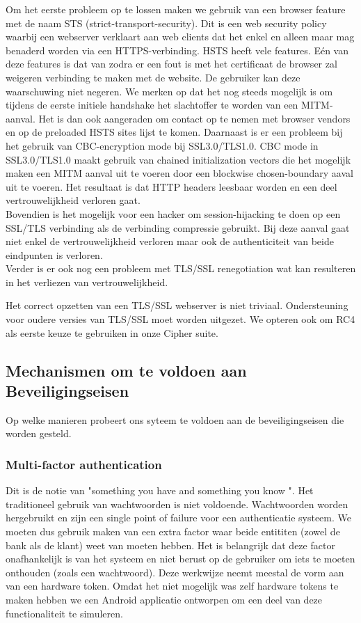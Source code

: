 \documentclass[11pt]{article}
\begin{document}
Om het eerste probleem op te lossen maken we gebruik van een browser feature met de naam STS (strict-transport-security). Dit is een web security policy waarbij een webserver verklaart aan web clients dat het enkel en alleen maar mag benaderd worden via een HTTPS-verbinding. HSTS heeft vele features. E\'en van deze features is dat van zodra er een fout is met het certificaat de browser zal weigeren verbinding te maken met de website. De gebruiker kan deze waarschuwing niet negeren. We merken op dat het nog steeds mogelijk is om tijdens de eerste initiele handshake het slachtoffer te worden van een MITM-aanval. Het is dan ook aangeraden om contact op te nemen met browser vendors en op de preloaded HSTS sites lijst te komen. \cite{HSTS} \cite{STS} \cite{prehsts}
\newline
Daarnaast is er een probleem bij het gebruik van CBC-encryption mode bij SSL3.0/TLS1.0. CBC mode in SSL3.0/TLS1.0 maakt gebruik van chained initialization vectors die het mogelijk maken een MITM aanval uit te voeren door een blockwise chosen-boundary aaval uit te voeren. Het resultaat is dat HTTP headers leesbaar worden en een deel vertrouwelijkheid verloren gaat.\cite{BEAST} \\

Bovendien is het mogelijk voor een hacker om session-hijacking te doen op een SSL/TLS verbinding als de verbinding compressie gebruikt. Bij deze aanval gaat niet enkel de vertrouwelijkheid verloren maar ook de authenticiteit van beide eindpunten is verloren. \cite{CRIME}\\

Verder is er ook nog een probleem met TLS/SSL renegotiation wat kan resulteren in het verliezen van vertrouwelijkheid. \cite{reg}

Het correct opzetten van een TLS/SSL webserver is niet triviaal. Ondersteuning voor oudere versies van TLS/SSL moet worden uitgezet. We opteren ook om RC4 als eerste keuze te gebruiken in onze Cipher suite.
\subsection{Mechanismen om te voldoen aan Beveiligingseisen}
Op welke manieren probeert ons syteem te voldoen aan de beveiligingseisen die worden gesteld.

\subsubsection{Multi-factor authentication}
Dit is de notie van "something you have and something you know ". 
\cite{multi_f}
Het traditioneel gebruik van wachtwoorden is niet voldoende. Wachtwoorden worden hergebruikt en zijn een single point of failure voor een authenticatie systeem. We moeten dus gebruik maken van een extra factor waar beide entititen (zowel de bank als de klant) weet van moeten hebben. Het is belangrijk dat deze factor onafhankelijk is van het systeem en niet berust op de gebruiker om iets te moeten onthouden (zoals een wachtwoord). Deze werkwijze neemt meestal de vorm aan van een hardware token. Omdat het niet mogelijk was zelf hardware tokens te maken hebben we een Android applicatie ontworpen om een deel van deze functionaliteit te simuleren.
\end{document}
